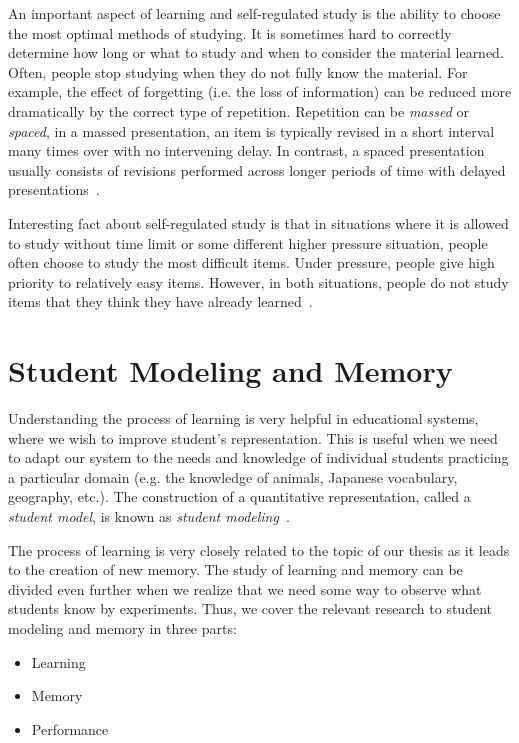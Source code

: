 An important aspect of learning and self-regulated study is the ability to choose the most optimal methods of studying. It is sometimes hard to correctly determine how long or what to study and when to consider the material learned. Often, people stop studying when they do not fully know the material. For example, the effect of forgetting (i.e. the loss of information) can be reduced more dramatically by the correct type of repetition. Repetition can be \textit{massed} or \textit{spaced}, in a massed presentation, an item is typically revised in a short interval many times over with no intervening delay. In contrast, a spaced presentation usually consists of revisions performed across longer periods of time with delayed presentations~\cite{kornell2008learning,pavlik2007optimizing}.

Interesting fact about self-regulated study is that in situations where it is allowed to study without time limit or some different higher pressure situation, people often choose to study the most difficult items. Under pressure, people give high priority to relatively easy items. However, in both situations, people do not study items that they think they have already learned~\cite{kornell2007promise}.

\section{Student Modeling and Memory}

Understanding the process of learning is very helpful in educational systems, where we wish to improve student's representation. This is useful when we need to adapt our system to the needs and knowledge of individual students practicing a particular domain (e.g. the knowledge of animals, Japanese vocabulary, geography, etc.). The construction of a quantitative representation, called a \textit{student model}, is known as \textit{student modeling}~\cite{Sison1998}.

The process of learning is very closely related to the topic of our thesis as it leads to the creation of new memory. The study of learning and memory can be divided even further when we realize that we need some way to observe what students know by experiments. Thus, we cover the relevant research to student modeling and memory in three parts:

\begin{itemize}
  \item Learning
  \item Memory
  \item Performance
\end{itemize}


